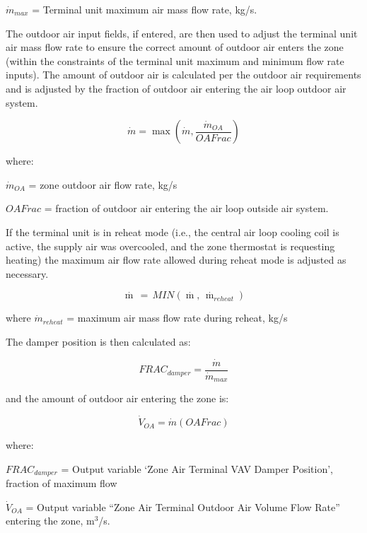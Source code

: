 \({\dot m_{max}}\) = Terminal unit maximum air mass flow rate, kg/s.

The outdoor air input fields, if entered, are then used to adjust the terminal unit air mass flow rate to ensure the correct amount of outdoor air enters the zone (within the constraints of the terminal unit maximum and minimum flow rate inputs). The amount of outdoor air is calculated per the outdoor air requirements and is adjusted by the fraction of outdoor air entering the air loop outdoor air system.

\begin{equation}
\dot m = \max \left( \dot m, \frac{\dot m_{OA}}{OAFrac} \right)
\end{equation}

where:

\(\dot m_{OA}\) = zone outdoor air flow rate, kg/s

\(OAFrac\) = fraction of outdoor air entering the air loop outside air system.

If the terminal unit is in reheat mode (i.e., the central air loop cooling coil is active, the supply air was overcooled, and the zone thermostat is requesting heating) the maximum air flow rate allowed during reheat mode is adjusted as necessary.

\begin{equation}
\mathop m\limits^\cdot  \, = \,MIN\left( {\mathop m\limits^\cdot  ,\,{{\mathop m\limits^\cdot  }_{reheat}}} \right)
\end{equation}

where \(\dot m_{reheat}\) = maximum air mass flow rate during reheat, kg/s

The damper position is then calculated as:

\begin{equation}
FRAC_{damper} = \frac{\dot m}{\dot m_{max}}
\end{equation}

and the amount of outdoor air entering the zone is:

\begin{equation}
\dot V_{OA} = \dot m (OAFrac)
\end{equation}

where:

\(FRAC_{damper}\) = Output variable `Zone Air Terminal VAV Damper Position', fraction of maximum flow

\(\dot V_{OA}\) = Output variable ``Zone Air Terminal Outdoor Air Volume Flow Rate'' entering the zone, m\(^3\)/s.

